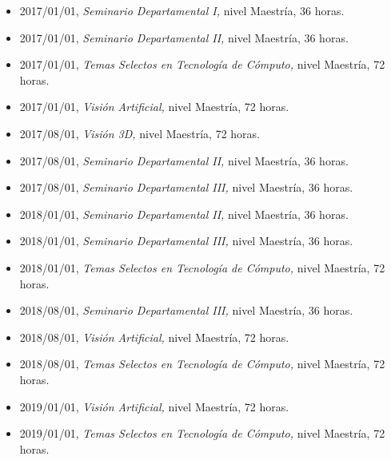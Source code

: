 \begin{itemize} 
\item 2017/01/01, \textit{ Seminario Departamental I,} nivel Maestría, 36 horas. 
\item 2017/01/01, \textit{ Seminario Departamental II,} nivel Maestría, 36 horas. 
\item 2017/01/01, \textit{ Temas Selectos en Tecnología de Cómputo,} nivel Maestría, 72 horas. 
\item 2017/01/01, \textit{ Visión Artificial,} nivel Maestría, 72 horas. 
\item 2017/08/01, \textit{ Visión 3D,} nivel Maestría, 72 horas. 
\item 2017/08/01, \textit{ Seminario Departamental II,} nivel Maestría, 36 horas. 
\item 2017/08/01, \textit{ Seminario Departamental III,} nivel Maestría, 36 horas. 
\item 2018/01/01, \textit{ Seminario Departamental II,} nivel Maestría, 36 horas. 
\item 2018/01/01, \textit{ Seminario Departamental III,} nivel Maestría, 36 horas. 
\item 2018/01/01, \textit{ Temas Selectos en Tecnología de Cómputo,} nivel Maestría, 72 horas. 
\item 2018/08/01, \textit{ Seminario Departamental III,} nivel Maestría, 36 horas. 
\item 2018/08/01, \textit{ Visión Artificial,} nivel Maestría, 72 horas. 
\item 2018/08/01, \textit{ Temas Selectos en Tecnología de Cómputo,} nivel Maestría, 72 horas. 
\item 2019/01/01, \textit{ Visión Artificial,} nivel Maestría, 72 horas. 
\item 2019/01/01, \textit{ Temas Selectos en Tecnología de Cómputo,} nivel Maestría, 72 horas. 
\end{itemize} 
